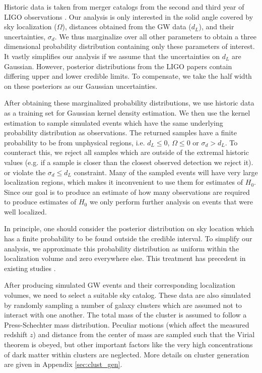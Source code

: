 
Historic data is taken from merger catalogs from the second and third year of LIGO observations \cite{GWTC_2,GWTC_3}. Our analysis is only interested in the solid angle covered by sky localization ($\Omega$), distances obtained from the GW data ($d_L$), and their uncertainties, $\sigma_d$. We thus marginalize over all other parameters to obtain a three dimensional probability distribution containing only these parameters of interest. It vastly simplifies our analysis if we assume that the uncertainties on $d_L$ are Gaussian. However, posterior distributions from the LIGO papers contain differing upper and lower credible limits. To compensate, we take the half width on these posteriors as our Gaussian uncertainties.

After obtaining these marginalized probability distributions, we use historic data as a training set for Gaussian kernel density estimation. We then use the kernel estimation to sample simulated events which have the same underlying probability distribution as observations. The returned samples have a finite probability to be from unphysical regions, i.e. $d_L \leq 0$, $\Omega\leq 0$ or $\sigma_d > d_L$. To counteract this, we reject all samples which are outside of the extremal historic values (e.g. if a sample is closer than the closest observed detection we reject it). or violate the $\sigma_d \leq d_L$ constraint. Many of the sampled events will have very large localization regions, which makes it inconvenient to use them for estimates of $H_0$. Since our goal is to produce an estimate of how many observations are required to produce estimates of $H_0$ we only perform further analysis on events that were well localized.

In principle, one should consider the posterior distribution on sky location which has a finite probability to be found outside the credible interval. To simplify our analysis, we approximate this probability distribution as uniform within the localization volume and zero everywhere else. This treatment has precedent in existing studies \cite{Nair_2018, GW170814_DES}.

After producing simulated GW events and their corresponding localization volumes, we need to select a suitable sky catalog. These data are also simulated by randomly sampling a number of galaxy clusters which are assumed not to interact with one another. The total mass of the cluster is assumed to follow a Press-Schechter mass distribution\cite{Press_1974}. Peculiar motions (which affect the measured redshift $z$) and distance from the center of mass are sampled such that the Virial theorem is obeyed, but other important factors like the very high concentrations of dark matter within clusters are neglected. More details on cluster generation are given in Appendix \ref{sec:clust_gen}.
    
